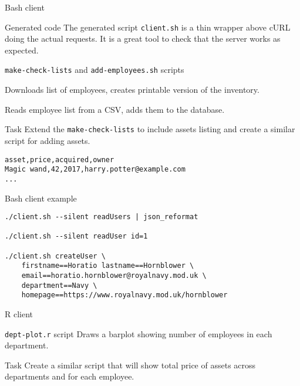 \begin{frame}[fragile]{Bash client}
    \begin{block}{Generated code}
        The generated script \texttt{client.sh} is a thin wrapper above
        cURL doing the actual requests.
        It is a great tool to check that the server works as expected.
    \end{block}
    
    \begin{block}{\texttt{make-check-lists} and \texttt{add-employees.sh}
        scripts}
        
        Downloads list of employees, creates printable version
        of the inventory.
    
        Reads employee list from a CSV, adds them to the database.
    \end{block}
    
    \begin{block}{Task}
        Extend the \texttt{make-check-lists} to include assets listing
        and create a similar script for adding assets.
        
\begin{lstlisting}
asset,price,acquired,owner
Magic wand,42,2017,harry.potter@example.com
...
\end{lstlisting}
    \end{block}
\end{frame}


\begin{frame}[fragile]{Bash client example}
\begin{lstlisting}
./client.sh --silent readUsers | json_reformat

./client.sh --silent readUser id=1

./client.sh createUser \
    firstname==Horatio lastname==Hornblower \
    email==horatio.hornblower@royalnavy.mod.uk \
    department==Navy \
    homepage==https://www.royalnavy.mod.uk/hornblower

\end{lstlisting}
\end{frame}


\begin{frame}[fragile]{R client}
    \begin{block}{\texttt{dept-plot.r} script}
        Draws a barplot showing number of employees in each department. 
    \end{block}
    
    \begin{block}{Task}
        Create a similar script that will show total price of
        assets across departments and for each employee.
    \end{block}
\end{frame}

